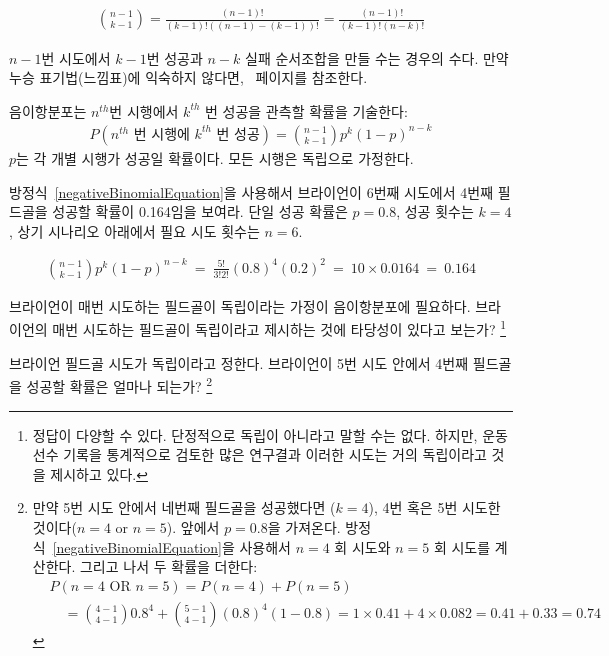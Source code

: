 \begin{eqnarray*}
{n-1 \choose k-1} = \frac{(n-1)!}{(k-1)! \left((n-1) - (k-1)\right)!} = \frac{(n-1)!}{(k-1)! \left(n - k\right)!}
\end{eqnarray*}

$n-1$번 시도에서 $k-1$번 성공과 $n-k$  실패 순서조합을 만들 수는 경우의 수다. 만약 누승 표기법(느낌표)에 익숙하지 않다면, \pageref{factorialDefinitionInTheBinomialSection}~페이지를 참조한다.

\begin{termBox}{
음이항분포는 $n^{th}$번 시행에서 $k^{th}$ 번 성공을 관측할 확률을 기술한다:
\begin{eqnarray}
P(\text{$n^{th}$ 번 시행에 $k^{th}$ 번 성공}) = {n-1 \choose k-1} p^{k}(1-p)^{n-k}
\label{negativeBinomialEquation}
\end{eqnarray}
$p$는 각 개별 시행가 성공일 확률이다. 모든 시행은 독립으로 가정한다.}
\end{termBox}

\textC{\pagebreak}

\begin{example}{
방정식~\eqref{negativeBinomialEquation}을 사용해서 브라이언이 6번째 시도에서 4번째 필드골을 성공할 확률이 0.164임을 보여라.}
단일 성공 확률은 $p=0.8$, 성공 횟수는 $k=4$, 상기 시나리오 아래에서 필요 시도 횟수는 $n=6$.

\begin{align*}
{n-1 \choose k-1}p^k(1-p)^{n-k}\ 
	=\ \frac{5!}{3!2!} (0.8)^4 (0.2)^2\ 
	=\ 10\times 0.0164\ 
	=\ 0.164
\end{align*}
\end{example}

\begin{exercise}
브라이언이 매번 시도하는 필드골이 독립이라는 가정이 음이항분포에 필요하다. 브라이언의 매번 시도하는 필드골이 독립이라고 제시하는 것에 타당성이 있다고 보는가?
\footnote{정답이 다양할 수 있다. 단정적으로 독립이 아니라고 말할 수는 없다. 하지만, 운동선수 기록을 통계적으로 검토한 많은 연구결과 이러한 시도는 거의 독립이라고 것을 제시하고 있다.}
\end{exercise}

\begin{exercise}
브라이언 필드골 시도가 독립이라고 정한다. 브라이언이 5번 시도 안에서 4번째 필드골을 성공할 확률은 얼마나 되는가?
\footnote{
만약 5번 시도 안에서 네번째 필드골을 성공했다면 ($k=4$), 4번 혹은 5번 시도한 것이다($n=4$ or $n=5$). 앞에서 $p=0.8$을 가져온다. 방정식~\eqref{negativeBinomialEquation}을 사용해서 $n=4$ 회 시도와 $n=5$ 회 시도를 계산한다. 그리고 나서 두 확률을 더한다:
\begin{align*}
& P(n=4\text{ OR }n=5) = P(n=4) + P(n=5) \\
&\quad = {4-1 \choose 4-1} 0.8^4 + {5-1 \choose 4-1} (0.8)^4(1-0.8) = 1\times 0.41 + 4\times 0.082 = 0.41 + 0.33 = 0.74
\end{align*}}
\end{exercise}

